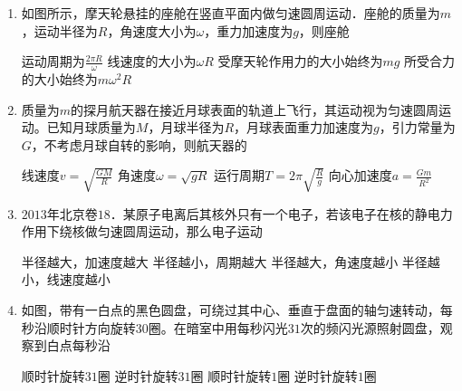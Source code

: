 
\begin{enumerate}[leftmargin=0em]
\renewcommand{\labelenumi}{\arabic{enumi}.}
\item
{}
如图所示，摩天轮悬挂的座舱在竖直平面内做匀速圆周运动．座舱的质量为$ m $，运动半径为$ R $，角速度大小为$ \omega $，重力加速度为$ g $，则座舱  
\begin{figure}[h!]
\centering

\end{figure}


\fourchoices
{运动周期为$\frac { 2 \pi R } { \omega }$}
{线速度的大小为$ \omega R $}
{受摩天轮作用力的大小始终为$ mg $}
{所受合力的大小始终为$ m \omega ^{2} R $}


\item 
{}
质量为$ m $的探月航天器在接近月球表面的轨道上飞行，其运动视为匀速圆周运动。已知月球质量为$ M $，月球半径为$ R $，月球表面重力加速度为$ g $，引力常量为$ G $，不考虑月球自转的影响，则航天器的  

\fourchoices
{线速度$v = \sqrt { \frac { G M } { R } }$}
{角速度$\omega = \sqrt { g R }$}
{运行周期$T = 2 \pi \sqrt { \frac { R } { g } }$ }
{向心加速度$a = \frac { G m } { R ^ { 2 } }$}

\item 
$ 2013 $年北京卷$ 18 $．某原子电离后其核外只有一个电子，若该电子在核的静电力作用下绕核做匀速圆周运动，那么电子运动  

\fourchoices
{半径越大，加速度越大}
{半径越小，周期越大}
{半径越大，角速度越小}
{半径越小，线速度越小}



\item 
{}
如图，带有一白点的黑色圆盘，可绕过其中心、垂直于盘面的轴匀速转动，每秒沿顺时针方向旋转$ 30 $圈。在暗室中用每秒闪光$ 31 $次的频闪光源照射圆盘，观察到白点每秒沿  
\begin{figure}[h!]
\centering

\end{figure}

\fourchoices
{顺时针旋转$ 31 $圈 }
{逆时针旋转$ 31 $圈}
{顺时针旋转$ 1 $圈 }
{逆时针旋转$ 1 $圈}








\end{enumerate}
